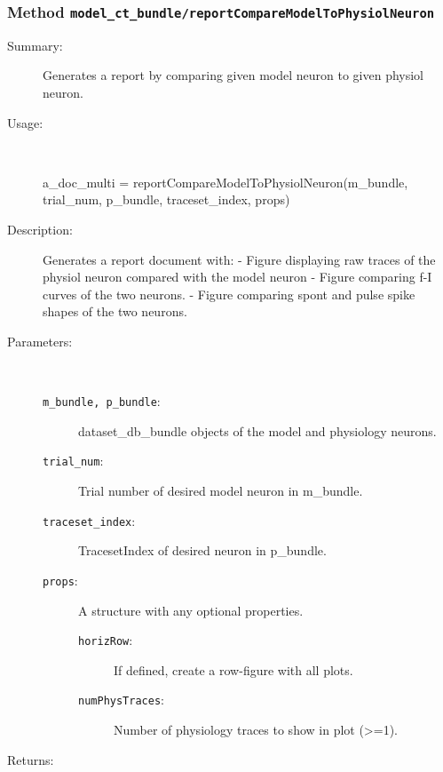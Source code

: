 \subsubsection[Method \texttt{reportCompareModelToPhysiolNeuron}]{Method \texttt{model\_ct\_bundle/reportCompareModelToPhysiolNeuron}}%
%
\label{ref_model_ct_bundle__reportCompareModelToPhysiolNeuron}%
\hypertarget{ref_model_ct_bundle__reportCompareModelToPhysiolNeuron}{}%
\begin{description}
\item[Summary:]Generates a report by comparing given model neuron to given physiol neuron.
%
\item[Usage:]~%
\begin{lyxcode}%
a\_doc\_multi = reportCompareModelToPhysiolNeuron(m\_bundle, trial\_num, p\_bundle, 
						  traceset\_index, props)
%
\end{lyxcode}%
%
\item[Description:]%
Generates a report document with:
	- Figure displaying raw traces of the physiol neuron compared with the model neuron
	- Figure comparing f-I curves of the two neurons.
	- Figure comparing spont and pulse spike shapes of the two neurons.
\item[Parameters:]~
\begin{description}%
\item[\texttt{m\_bundle, p\_bundle}:]
 dataset\_db\_bundle objects of the model and physiology neurons.
\item[\texttt{trial\_num}:]
 Trial number of desired model neuron in m\_bundle.
\item[\texttt{traceset\_index}:]
 TracesetIndex of desired neuron in p\_bundle.
\item[\texttt{props}:]
 A structure with any optional properties.
\begin{description}%
\item[\texttt{horizRow}:]
 If defined, create a row-figure with all plots.
\item[\texttt{numPhysTraces}:]
 Number of physiology traces to show in plot (>=1).
\end{description}%
\end{description}%
%
\item[Returns:]~


\end{description}
